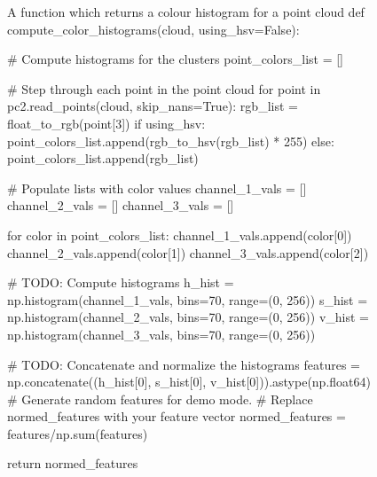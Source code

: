 \documentclass[a4paper]{article}
\begin{document}
\begin{figure}[h]\scriptsize
\begin{sexylisting}{A function which returns a colour histogram for a point cloud}
def compute_color_histograms(cloud, using_hsv=False):

	# Compute histograms for the clusters
	point_colors_list = []

	# Step through each point in the point cloud
	for point in pc2.read_points(cloud, skip_nans=True):
		rgb_list = float_to_rgb(point[3])
		if using_hsv:
			point_colors_list.append(rgb_to_hsv(rgb_list) * 255)
		else:
			point_colors_list.append(rgb_list)

	# Populate lists with color values
	channel_1_vals = []
	channel_2_vals = []
	channel_3_vals = []

	for color in point_colors_list:
		channel_1_vals.append(color[0])
		channel_2_vals.append(color[1])
		channel_3_vals.append(color[2])

	# TODO: Compute histograms
	h_hist = np.histogram(channel_1_vals, bins=70, range=(0, 256))
	s_hist = np.histogram(channel_2_vals, bins=70, range=(0, 256))
	v_hist = np.histogram(channel_3_vals, bins=70, range=(0, 256))

	# TODO: Concatenate and normalize the histograms
	features = np.concatenate((h_hist[0], s_hist[0], v_hist[0])).astype(np.float64)
	# Generate random features for demo mode.
	# Replace normed_features with your feature vector
	normed_features = features/np.sum(features)

	return normed_features		
\end{sexylisting}
\end{figure}

\newpage
\end{document}
